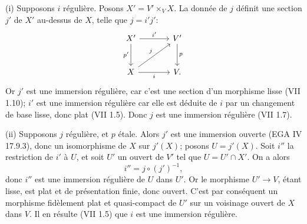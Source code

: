 \documentclass[11pt]{article}
\begin{document}
(i) Supposons $i$ régulière. Posons $X'=V'\times_V X$. La donnée de $j$ définit une section $j'$ de $X'$ au-dessus de $X$, telle que $j=i'j'$:
\[
\begin{tikzcd}[column sep=large,row sep=large]
X' \arrow[r,"i'"] \arrow[d,"p'"'] & V' \arrow[d,"p"]\\
X \arrow[r,"i"'] \arrow[ur,"j"] & V .
\end{tikzcd}
\]
Or $j'$ est une immersion régulière, car c'est une section d'un morphisme lisse (VII 1.10); $i'$ est une immersion régulière car elle est déduite de $i$ par un changement de base lisse, donc plat (VII 1.5). Donc $j$ est une immersion régulière (VII 1.7).

(ii) Supposons $j$ régulière, et $p$ étale. Alors $j'$ est une immersion ouverte (EGA IV 17.9.3), donc un isomorphisme de $X$ sur $j'(X)$; posons $U=j'(X)$. Soit $i''$ la restriction de $i'$ à $U$, et soit $U'$ un ouvert de $V'$ tel que $U=U'\cap X'$. On a alors
\[
i''=j\circ(j')^{-1},
\]
donc $i''$ est une immersion régulière de $U$ dans $U'$. Or le morphisme $U'\to V$, étant lisse, est plat et de présentation finie, donc ouvert. C'est par conséquent un morphisme fidèlement plat et quasi-compact de $U'$ sur un voisinage ouvert de $X$ dans $V$. Il en résulte (VII 1.5) que $i$ est une immersion régulière.
\end{document}
